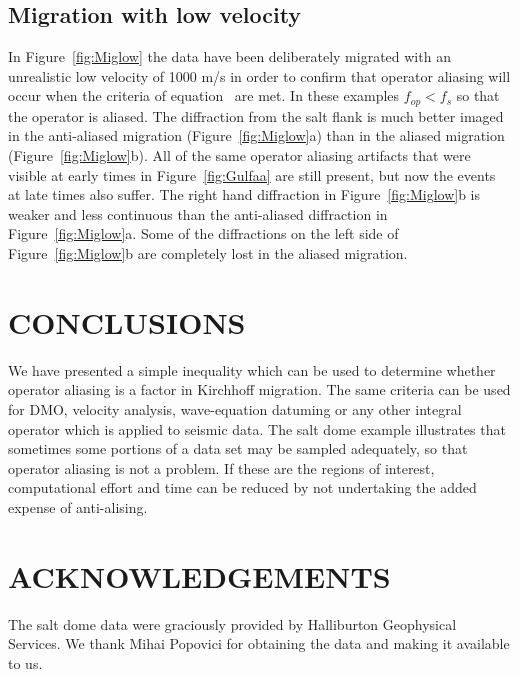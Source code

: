 \subsection{Migration with low velocity}
In Figure~\ref{fig:Miglow} the data have been deliberately
migrated with an unrealistic
low velocity of 1000 m/s in order to confirm that operator aliasing
will occur when the criteria of equation~ are met.
In these examples $f_{op} < f_s$ so that the operator is aliased.
The diffraction from the salt flank is much better imaged in the
anti-aliased migration (Figure~\ref{fig:Miglow}a) than in the aliased
migration (Figure~\ref{fig:Miglow}b).  All of the same operator aliasing 
artifacts  that were visible at early times in Figure~\ref{fig:Gulfaa} are
still present, but now the events at late times also suffer. The
right hand diffraction in Figure~\ref{fig:Miglow}b is weaker and less continuous
than the anti-aliased diffraction in Figure~\ref{fig:Miglow}a.
Some of the diffractions on the left side of Figure~\ref{fig:Miglow}b are
completely lost in the aliased migration.


\section{CONCLUSIONS}
We have presented a simple inequality which can be used to determine
whether operator aliasing is a factor in Kirchhoff migration. The same
criteria can be used for DMO, velocity analysis, wave-equation datuming
or any other integral operator which is applied to seismic data.
The salt dome example illustrates that sometimes some portions of a data set
may be sampled adequately, so that operator aliasing is not a problem.
If these are the regions of interest, computational effort
and time can be reduced by not undertaking the added expense 
of anti-alising.

\section{ACKNOWLEDGEMENTS}
The salt dome data were graciously provided by Halliburton Geophysical Services.
We thank Mihai Popovici for obtaining the data and making it available to us.




